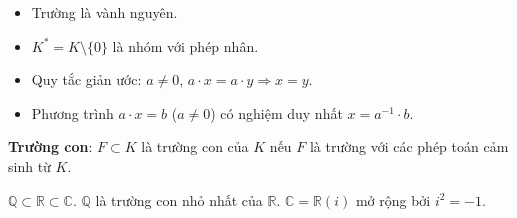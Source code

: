 \documentclass[12pt,a4paper]{article}
\begin{document}
\begin{tinhchat}[title={Tính chất của trường}]
  \begin{itemize}
    \item Trường là vành nguyên.
    \item $K^* = K \setminus \{0\}$ là nhóm với phép nhân.
    \item Quy tắc giản ước: $a \ne 0$, $a \cdot x = a \cdot y \Rightarrow x = y$.
    \item Phương trình $a \cdot x = b$ ($a \ne 0$) có nghiệm duy nhất $x = a^{-1} \cdot b$.
  \end{itemize}
\end{tinhchat}

\begin{dinhnghia}
  \textbf{Trường con}: $F \subset K$ là trường con của $K$ nếu $F$ là trường với các phép toán cảm sinh từ $K$.
\end{dinhnghia}

\begin{vidu}
  $\mathbb{Q} \subset \mathbb{R} \subset \mathbb{C}$. $\mathbb{Q}$ là trường con nhỏ nhất của $\mathbb{R}$. $\mathbb{C} = \mathbb{R}(i)$ mở rộng bởi $i^2 = -1$.
\end{vidu}
\end{document}
